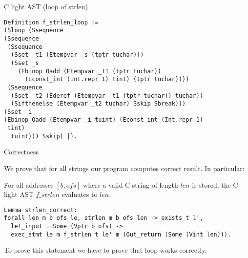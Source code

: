 \documentclass{beamer}
\begin{document}
\begin{frame}[fragile]{C light AST (loop of strlen)}

\begin{lstlisting}[language=Coq]
Definition f_strlen_loop := 
(Sloop (Ssequence
(Ssequence
 (Ssequence
  (Sset _t1 (Etempvar _s (tptr tuchar)))
  (Sset _s
    (Ebinop Oadd (Etempvar _t1 (tptr tuchar))
      (Econst_int (Int.repr 1) tint) (tptr tuchar))))
 (Ssequence
  (Sset _t2 (Ederef (Etempvar _t1 (tptr tuchar)) tuchar))
  (Sifthenelse (Etempvar _t2 tuchar) Sskip Sbreak)))
(Sset _i
(Ebinop Oadd (Etempvar _i tuint) (Econst_int (Int.repr 1)
 tint)
  tuint))) Sskip) |}.

\end{lstlisting}

\end{frame}

\begin{frame}[fragile]{Correctness}

  We prove that for all strings our program computes correct result. In particular:
  
  \begin{theorem}
    For all addresses $[b, ofs]$ where a valid C string of length $len$ is stored, the C light AST $f\_strlen$ evaluates to $len$.
  \end{theorem}
  
  
  \begin{lstlisting}[language=Coq]
Lemma strlen_correct:
forall len m b ofs le, strlen m b ofs len -> exists t l',
  le!_input = Some (Vptr b ofs) ->
  exec_stmt le m f_strlen t le' m (Out_return (Some (Vint len))).

\end{lstlisting}

To prove this statement we have to prove that loop works correctly.

 



\end{frame}
\end{document}
